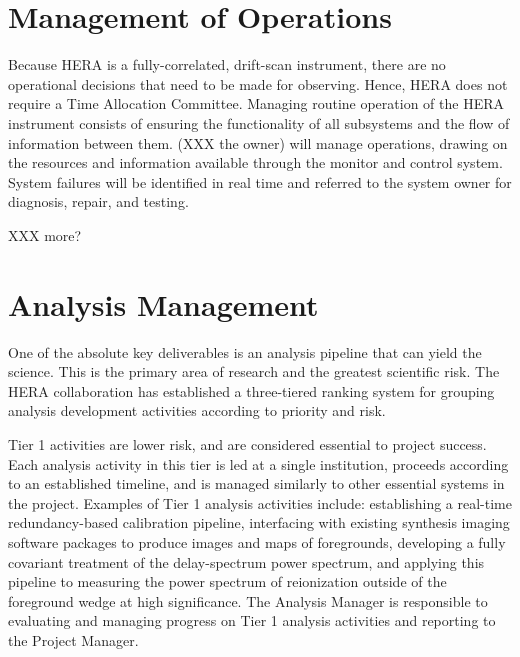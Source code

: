 \documentclass[preprint]{aastex}
\begin{document}
\section{Management of Operations}
\label{sec:operations}

Because HERA is a fully-correlated, drift-scan instrument, there are no operational decisions
that need to be made for observing.  Hence, HERA does not require a Time Allocation Committee.
Managing routine operation of the HERA instrument consists of ensuring the functionality of all 
subsystems and the flow of information between them.  (XXX the owner) will manage operations, drawing on the resources and information
available through the monitor and control system.  System failures will be identified in real
time and referred to the system owner for diagnosis, repair, and testing.

XXX more?

\section{Analysis Management}
\label{sec:analysis}

One of the absolute key deliverables is an analysis pipeline that can yield the science.  This is the primary area of
research and the greatest scientific risk.  The HERA collaboration has established
a three-tiered ranking system for grouping analysis development activities according to priority and risk.

Tier 1 activities are lower risk, and are considered essential to project success.  Each analysis activity
in this tier is led at a single institution, proceeds according to an established timeline, and is managed
similarly to other essential systems in the project.  Examples of Tier 1 analysis activities include:
establishing a real-time redundancy-based calibration pipeline, interfacing with existing synthesis imaging
software packages to produce images and maps of foregrounds, developing a fully covariant treatment of
the delay-spectrum power spectrum, and applying this pipeline to measuring the power spectrum of reionization
outside of the foreground wedge at high significance.
The Analysis Manager is responsible to evaluating
and managing progress on Tier 1 analysis activities and reporting to the Project Manager.
\end{document}
